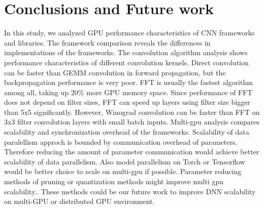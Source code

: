 \section{Conclusions and Future work}

In this study, we analyzed GPU performance characteristics of CNN frameworks and libraries.
The framework comparison reveals the differences in implementations of the frameworks.
The convolution algorithm analysis shows performance characteristics of different convolution kernels.
Direct convolution can be faster than GEMM convolution in forward propagation, but the backpropagation performance is very poor.
FFT is usually the fastest algorithm among all, taking up 20\% more GPU memory space.
Since performance of FFT does not depend on filter sizes, FFT can speed up layers using filter size bigger than 5x5 significantly.
However, Winograd convolution can be faster than FFT on 3x3 filter convolution layers with small batch inputs.
Multi-gpu analysis compares scalability and synchronization overhead of the frameworks.
Scalability of data paralellism approch is bounded by communication overhead of parameters.
Therefore reducing the amount of parameter communication would achieve better scalability of data parallelism.
Also model parallelism on Torch or Tensorflow would be better choice to scale on multi-gpu if possible.
Parameter reducing methods of pruning or quantization methods might improve multi gpu scalability.\cite{squeezenet, deepcompress}.
These methods could be our future work to improve DNN scalability on multi-GPU or distributed GPU environment.